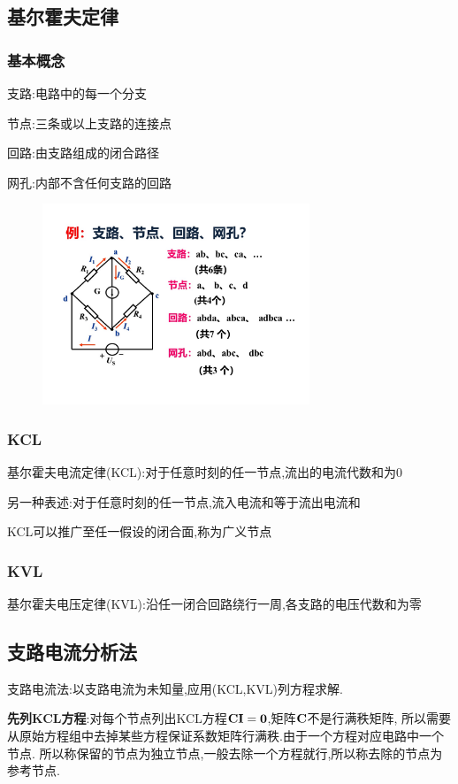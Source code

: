 \documentclass[12pt,a4paper,oneside]{ctexart}
\begin{document}
\subsection{基尔霍夫定律}
\subsubsection{基本概念}
支路:电路中的每一个分支

节点:三条或以上支路的连接点

回路:由支路组成的闭合路径

网孔:内部不含任何支路的回路
\begin{figure}[H]
    \centering
    \includegraphics[width=8cm]{photos/支路节点回路网孔.jpg}
\end{figure}

\subsubsection{KCL}
基尔霍夫电流定律(KCL):对于任意时刻的任一节点,流出的电流代数和为0

另一种表述:对于任意时刻的任一节点,流入电流和等于流出电流和

KCL可以推广至任一假设的闭合面,称为广义节点

\subsubsection{KVL}
基尔霍夫电压定律(KVL):沿任一闭合回路绕行一周,各支路的电压代数和为零

\subsection{支路电流分析法}
支路电流法:以支路电流为未知量,应用(KCL,KVL)列方程求解.

\textbf{先列KCL方程}:对每个节点列出KCL方程$\bf{CI}=\bf{0}$,矩阵$\bf{C}$不是行满秩矩阵,
所以需要从原始方程组中去掉某些方程保证系数矩阵行满秩.由于一个方程对应电路中一个节点.
所以称保留的节点为独立节点,一般去除一个方程就行,所以称去除的节点为参考节点.
\end{document}
